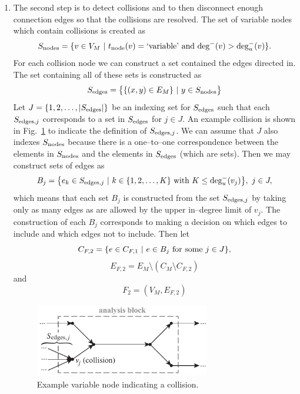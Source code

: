 \begin{enumerate}
\item The second step is to detect collisions and to then disconnect enough connection edges so that the collisions are resolved. The set of variable nodes which contain collisions is created as
\begin{equation}
S_\textrm{nodes} = \{v \in V_M \ | \  t_\textrm{node}(v) = \textrm{`variable'} \textrm{ and } \textrm{deg}^-(v) > \textrm{deg}_u^-(v) \}.
\end{equation}
For each collision node we can construct a set contained the edges directed in. The set containing all of these sets is constructed as
\begin{equation}
S_\textrm{edges} = \big \{ \{(x,y) \in E_M\} \ | \  y \in S_\textrm{nodes} \big \}
\end{equation}
Let $J=\{1,2,\ldots,|S_\textrm{edges}|\}$ be an indexing set for $S_\textrm{edges}$ such that each $S_{\textrm{edges},j}$ corresponds to a set in $S_\textrm{edges}$ for $j \in J$. 
An example collision is shown in Fig.~\ref{f:collision} to indicate the definition of $S_{\textrm{edges},j}$. 
We can assume that $J$ also indexes $S_\textrm{nodes}$ because there is a one--to--one correspondence between the elements in $S_\textrm{nodes}$ and the elements in $S_\textrm{edges}$ (which are sets). 
Then we may construct sets of edges as
\begin{equation}
B_j = \big \{e_k \in S_{\textrm{edges},j} \ | \  k \in \{1,2,\ldots,K\} \textrm{ with } K \leq \textrm{deg}_u^-(v_j) \big \}, \ j \in J,
\end{equation}
which means that each set $B_j$ is constructed from the set $S_{\textrm{edges},j}$ by taking only as many edges as are allowed by the upper in--degree limit of $v_j$. The construction of each $B_j$ corresponds to making a decision on which edges to include and which edges not to include. Then let
\begin{equation}
C_{F,2} = \{ e \in C_{F,1} \ | \  e \in B_j \textrm{ for some } j \in J\},
\end{equation}
\begin{equation}
E_{F,2} = E_M \setminus (C_M \setminus C_{F,2})
\end{equation}
and
\begin{equation}
F_2 = (V_M,E_{F,2})
\end{equation}
\begin{figure}[htb!]
	\begin{center}
	\includegraphics[width=3in]{images/analysis_block_collision}
	\end{center}
	\vspace{-20pt}
\caption{Example variable node indicating a collision.}
\label{f:collision}
\end{figure}


\end{enumerate}
